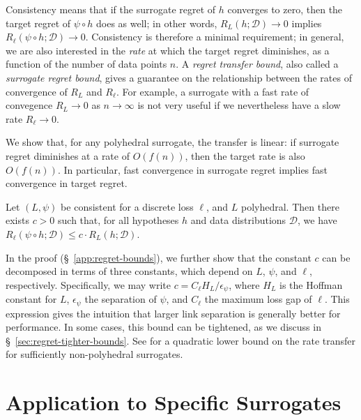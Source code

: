 \documentclass[twoside,11pt]{article}
\newcommand{\D}{\mathcal{D}}
\begin{document}
Consistency means that if the surrogate regret of $h$ converges to zero, then the target regret of $\psi \circ h$ does as well; in other words, $R_L(h;\D) \to 0$ implies $R_{\ell}(\psi \circ h;\D) \to 0$.
Consistency is therefore a minimal requirement; in general, we are also interested in the \emph{rate} at which the target regret diminishes, as a function of the number of data points $n$.
A \emph{regret transfer bound}, also called a \emph{surrogate regret bound}, gives a guarantee on the relationship between the rates of convergence of $R_L$ and $R_{\ell}$.
For example, a surrogate with a fast rate of convegence $R_L \to 0$ as $n \to \infty$ is not very useful if we nevertheless have a slow rate $R_{\ell} \to 0$.

We show that, for any polyhedral surrogate, the transfer is linear: if surrogate regret diminishes at a rate of $O(f(n))$, then the target rate is also $O(f(n))$.
In particular, fast convergence in surrogate regret implies fast convergence in target regret.
\begin{theorem}
  \label{thm:linear-regret-bound}
  Let $(L,\psi)$ be consistent for a discrete loss $\ell$, and $L$ polyhedral.
  Then there exists $c > 0$ such that, for all hypotheses $h$ and data distributions $\D$, we have $R_{\ell}(\psi \circ h;\D) \leq c \cdot R_L(h;\D)$.
\end{theorem}
In the proof (\S~\ref{app:regret-bounds}), we further show that the constant $c$ can be decomposed in terms of three constants, which depend on $L$, $\psi$, and $\ell$, respectively.
Specifically, we may write $c = C_\ell H_L / \epsilon_\psi$, where $H_L$ is the Hoffman constant for $L$, $\epsilon_\psi$ the separation of $\psi$, and $C_\ell$ the maximum loss gap of $\ell$.
This expression gives the intuition that larger link separation is generally better for performance.
In some cases, this bound can be tightened, as we discuss in \S~\ref{sec:regret-tighter-bounds}.
See \citet{frongillo2021surrogate} for a quadratic lower bound on the rate transfer for sufficiently non-polyhedral surrogates.


\section{Application to Specific Surrogates}\label{sec:applications}
\end{document}
